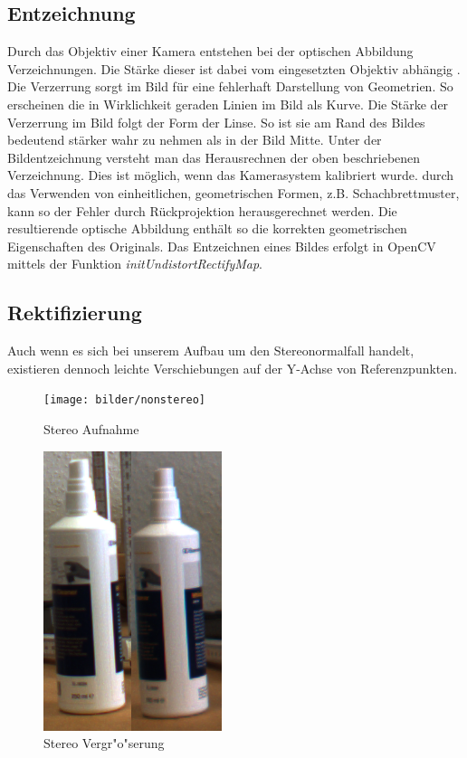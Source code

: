 \subsection{Entzeichnung}
\label{sec:entzeichnung}

Durch das Objektiv einer Kamera entstehen bei der optischen Abbildung Verzeichnungen. Die Stärke dieser ist dabei vom eingesetzten Objektiv abhängig \cite{wie}. Die Verzerrung sorgt im Bild für eine fehlerhaft Darstellung von Geometrien. So erscheinen die in Wirklichkeit geraden Linien im Bild als Kurve.
Die Stärke der Verzerrung im Bild folgt der Form der Linse. So ist sie am Rand des Bildes bedeutend stärker wahr zu nehmen als in der Bild Mitte.\newline
\noindent Unter der Bildentzeichnung versteht man das Herausrechnen der oben beschriebenen Verzeichnung. Dies ist möglich, wenn das Kamerasystem kalibriert wurde. durch das Verwenden von einheitlichen, geometrischen Formen, z.B. Schachbrettmuster, kann so der Fehler durch Rückprojektion herausgerechnet werden. Die resultierende optische Abbildung enthält so die korrekten geometrischen Eigenschaften des Originals. Das Entzeichnen eines Bildes erfolgt in OpenCV mittels der Funktion \textit{initUndistortRectifyMap}.

\subsection{Rektifizierung}
\label{sec:rektifizierung}

\noindent Auch wenn es sich bei unserem Aufbau um den Stereonormalfall handelt, existieren dennoch leichte Verschiebungen auf der Y-Achse von Referenzpunkten.

\begin{figure}[H]
	\texttt{[image: bilder/nonstereo]}
	\caption[Stereo Szenenaufnahme]{Stereo Aufnahme}
	\label{fig:steresene}%
\end{figure}

\begin{figure}[H]
	\includegraphics[scale=0.4]{bilder/nonparallal}
	\caption[Stereo Vergr"o"serung]{Stereo Vergr"o"serung}
	\label{fig:vergr}%
\end{figure}

